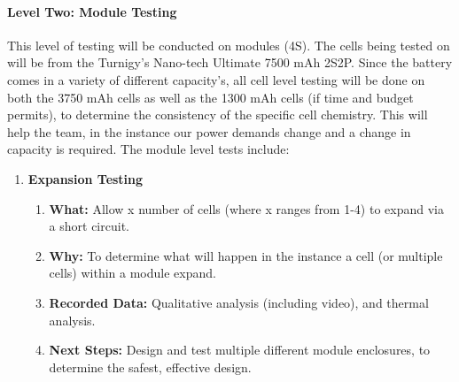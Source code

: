 \documentclass[main.tex]{subfile}
\begin{document}
    \paragraph{Level Two: Module Testing}
    This level of testing will be conducted on modules (4S). The cells being tested on will be from the Turnigy’s Nano-tech Ultimate  7500 mAh 2S2P. Since the battery comes in a variety of different capacity’s, all cell level testing will be done on both the 3750 mAh cells as well as the 1300 mAh cells (if time and budget permits), to determine the consistency of the specific cell chemistry. This will help the team, in the instance our power demands change and a change in capacity is required. The module level tests include:
    \begin{enumerate}
        \item \textbf{Expansion Testing}
        \begin{enumerate}
            \item \textbf{What: }Allow x number of cells (where x ranges from 1-4) to expand via a short circuit.
            \item \textbf{Why: }To determine what will happen in the instance a cell (or multiple cells) within a module expand.
            \item \textbf{Recorded Data: }Qualitative analysis (including video), and thermal analysis.
            \item \textbf{Next Steps: }Design and test multiple different module enclosures, to determine the safest, effective design.
        \end{enumerate}
    \end{enumerate}
\end{document}
